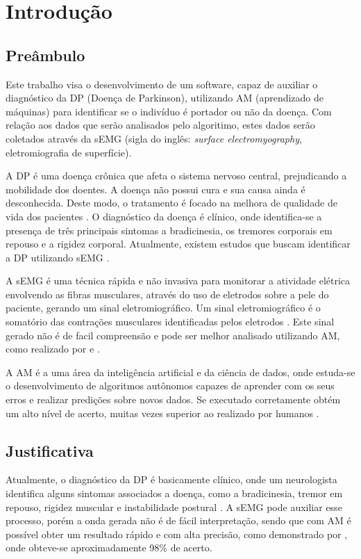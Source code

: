 \chapter[Introdução]{Introdução} 
\section{Preâmbulo} 
Este trabalho visa o desenvolvimento de um software, capaz de auxiliar o diagnóstico da DP (Doença de Parkinson), utilizando AM (aprendizado de máquinas) para identificar se o indivíduo é portador ou não da doença. Com relação aos dados que serão analisados pelo algoritimo, estes dados serão coletados através da sEMG (sigla do inglês: \textit{surface electromyography}, eletromiografia de superfície). 

A DP é uma doença crônica que afeta o sistema nervoso central, prejudicando a mobilidade dos doentes. A doença não possui cura e sua causa ainda é desconhecida. Deste modo, o tratamento é focado na melhora de qualidade de vida dos pacientes \cite{da2016aspectos}. O diagnóstico da doença é clínico, onde identifica-se a presença de três principais sintomas a bradicinesia, os tremores corporais em repouso e a rigidez corporal. Atualmente, existem estudos que buscam identificar a DP utilizando sEMG \cite{eftaxias2015detection}.

A sEMG é uma técnica rápida e não invasiva para monitorar a atividade elétrica envolvendo as fibras musculares, através do uso de eletrodos sobre a pele do paciente, gerando um sinal eletromiográfico. Um sinal eletromiográfico é o somatório das contrações musculares identificadas pelos eletrodos \cite{de2010eletromiografia}. Este sinal gerado não é de facil compreensão e pode ser melhor analisado utilizando AM, como realizado por  e . 

A AM é a uma área da inteligência artificial e da ciência de dados, onde estuda-se o desenvolvimento de algoritmos autônomos capazes de aprender com os seus erros e realizar predições sobre novos dados. Se executado corretamente obtém um alto nível de acerto, muitas vezes superior ao realizado por humanos \cite{Kohavi}. 

\section{Justificativa} 
Atualmente, o diagnóstico da DP é basicamente clínico, onde um neurologista identifica alguns sintomas associados a doença, como a bradicinesia, tremor em repouso, rigidez muscular e instabilidade postural \cite{gago2014manual}. A sEMG pode auxiliar esse processo, porém a onda gerada não é de fácil interpretação, sendo que com AM é possível obter um resultado rápido e com alta precisão, como demonstrado por , onde obteve-se aproximadamente 98\% de acerto. 

